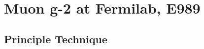 
\thispagestyle{myheadings} %

\graphicspath{{Body/Figures/ExperimentalOverview/Decay/}{Body/Figures/TrackingFigures/TrackerPics/}{Body/Figures/ExperimentalOverview/Ring/}{Body/Figures/ExperimentalOverview/Auxiliary/}}

\chapter{Muon g-2 at Fermilab, E989}
\label{chapter:Muon g-2 at Fermilab, E989}

\section{Principle Technique}
\label{sec:PrincipleTechnique}



